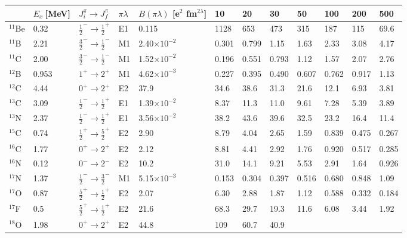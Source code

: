 \documentclass[prc,preprint,showpacs,showkeys,nofootinbib]{revtex4}%
\begin{document}
\begin{tabular}
[c]{|l|l|l|l|l|l|l|l|l|l|l|l|}\hline
& $E_{x}\ $[MeV] & $J_{i}^{\pi}\rightarrow J_{f}^{\pi}$ & $\pi\lambda$ &
$B(\pi\lambda)$ [e$^{2}$ fm$^{2\lambda}$] & 10 & 20 & 30 & 50 & 100 & 200 &
500\\\hline\hline
$^{11}$Be & 0.32 & $\frac{1}{2}^{-}\rightarrow\frac{1}{2}^{+}$ & E1 & 0.115 &
1128 & 653 & 473 & 315 & 187 & 115 & 69.6\\\hline
$^{11}$B & 2.21 & $\frac{3}{2}^{-}\rightarrow\frac{1}{2}^{-}$ & M1 &
2.40$\times10^{-2}$ & 0.301 & 0.799 & 1.15 & 1.63 & 2.33 & 3.08 & 4.17\\\hline
$^{11}$C & 2.00 & $\frac{3}{2}^{-}\rightarrow\frac{1}{2}^{-}$ & M1 &
1.52$\times10^{-2}$ & 0.196 & 0.551 & 0.793 & 1.12 & 1.57 & 2.07 &
2.76\\\hline
$^{12}$B & 0.953 & $1^{+}\rightarrow2^{+}$ & M1 & 4.62$\times10^{-3}$ &
0.227 & 0.395 & 0.490 & 0.607 & 0.762 & 0.917 & 1.13\\\hline
$^{12}$C & 4.44 & $0^{+}\rightarrow2^{+}$ & E2 & 37.9 & 34.6 & 38.6 & 31.3 &
21.6 & 12.1 & 6.93 & 3.81\\\hline
$^{13}$C & 3.09 & $\frac{1}{2}^{-}\rightarrow\frac{1}{2}^{+}$ & E1 &
1.39$\times10^{-2}$ & 8.37 & 11.3 & 11.0 & 9.61 & 7.28 & 5.39 & 3.89\\\hline
$^{13}$N & 2.37 & $\frac{1}{2}^{-}\rightarrow\frac{1}{2}^{+}$ & E1 &
3.56$\times10^{-2}$ & 38.2 & 43.6 & 39.6 & 32.5 & 23.2 & 16.4 & 11.4\\\hline
$^{15}$C & 0.74 & $\frac{1}{2}^{+}\rightarrow\frac{5}{2}^{+}$ & E2 & 2.90 &
8.79 & 4.04 & 2.65 & 1.59 & 0.839 & 0.475 & 0.267\\\hline
$^{16}$C & 1.77 & $0^{+}\rightarrow2^{+}$ & E2 & 2.12 & 8.81 & 4.41 & 2.92 &
1.76 & 0.920 & 0.517 & 0.285\\\hline
$^{16}$N & 0.12 & $0^{-}\rightarrow2^{-}$ & E2 & 10.2 & 31.0 & 14.1 & 9.21 &
5.53 & 2.91 & 1.64 & 0.926\\\hline
$^{17}$N & 1.37 & $\frac{1}{2}^{-}\rightarrow\frac{3}{2}^{-}$ & M1 &
5.15$\times10^{-3}$ & 0.153 & 0.304 & 0.397 & 0.516 & 0.680 & 0.848 &
1.09\\\hline
$^{17}$O & 0.87 & $\frac{5}{2}^{+}\rightarrow\frac{1}{2}^{+}$ & E2 & 2.07 &
6.30 & 2.88 & 1.87 & 1.12 & 0.588 & 0.332 & 0.184\\\hline
$^{17}$F & 0.5 & $\frac{5}{2}^{+}\rightarrow\frac{1}{2}^{+}$ & E2 & 21.6 &
68.3 & 29.7 & 19.3 & 11.6 & 6.08 & 3.44 & 1.92\\\hline
$^{18}$O & 1.98 & $0^{+}\rightarrow2^{+}$ & E2 & 44.8 & 109 & 60.7 & 40.9 &

\end{tabular}
\end{document}
